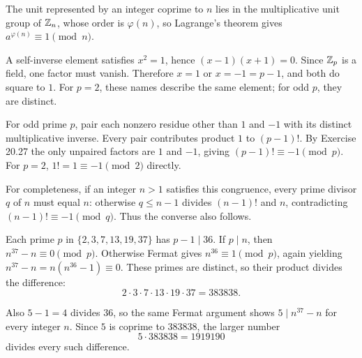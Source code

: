 The unit represented by an integer coprime to $n$ lies in the multiplicative unit group of $\mathbb{Z}_n$, whose order is $\varphi(n)$, so Lagrange's theorem gives $a^{\varphi(n)}\equiv1\pmod n$.

A self-inverse element satisfies $x^2=1$, hence $(x-1)(x+1)=0$. Since $\mathbb{Z}_p$ is a field, one factor must vanish. Therefore $x=1$ or $x=-1=p-1$, and both do square to $1$. For $p=2$, these names describe the same element; for odd $p$, they are distinct.

For odd prime $p$, pair each nonzero residue other than $1$ and $-1$ with its distinct multiplicative inverse. Every pair contributes product $1$ to $(p-1)!$. By Exercise 20.27 the only unpaired factors are $1$ and $-1$, giving $(p-1)!\equiv-1\pmod p$. For $p=2$, $1!=1\equiv-1\pmod2$ directly.\par
For completeness, if an integer $n>1$ satisfies this congruence, every prime divisor $q$ of $n$ must equal $n$: otherwise $q\le n-1$ divides $(n-1)!$ and $n$, contradicting $(n-1)!\equiv-1\pmod q$. Thus the converse also follows.

Each prime $p$ in $\{2,3,7,13,19,37\}$ has $p-1\mid36$. If $p\mid n$, then $n^{37}-n\equiv0\pmod p$. Otherwise Fermat gives $n^{36}\equiv1\pmod p$, again yielding $n^{37}-n=n(n^{36}-1)\equiv0$. These primes are distinct, so their product divides the difference:
\[2\cdot3\cdot7\cdot13\cdot19\cdot37=\boxed {383838}.
\]

Also $5-1=4$ divides $36$, so the same Fermat argument shows $5\mid n^{37}-n$ for every integer $n$. Since $5$ is coprime to $383838$, the larger number
\[\boxed{5\cdot383838=1919190}
\]
divides every such difference.
